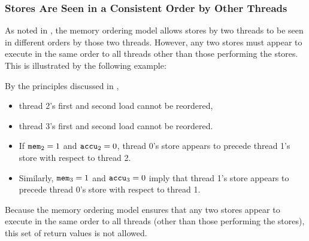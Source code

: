 \newpage

\subsubsection*{Stores Are Seen in a Consistent Order by Other Threads}

As noted in \cite[Section 8.2.3.5]{ref:Intel}, the memory ordering model allows stores by two threads to be seen in different orders by those two threads.
However, any two stores must appear to execute in the same order to all threads other than those performing the stores.
This is illustrated by the following example:

\begin{table}[!hbt]
\noindent{}
\caption[Stores Are Seen in a Consistent Order by Other Threads]{Stores Are Seen in a Consistent Order by Other Threads \cite[Example 8-7]{ref:Intel}}
\label{tbl:litmus:intel:7}
\end{table}

\noindent
By the principles discussed in \cite[Section 8.2.3.2]{ref:Intel},
\begin{itemize}
  \item thread 2’s first and second load cannot be reordered,
  \item thread 3’s first and second load cannot be reordered.
  \item If $\texttt{mem}_2 = 1$ and $\texttt{accu}_2 = 0$, thread 0’s store appears to precede thread 1’s store with respect to thread 2.
  \item Similarly, $\texttt{mem}_3 = 1$ and $\texttt{accu}_3 = 0$ imply that thread 1’s store appears to precede thread 0’s store with respect to thread 1.
\end{itemize}
Because the memory ordering model ensures that any two stores appear to execute in the same order to all threads (other than those performing the stores), this set of return values is not allowed.

